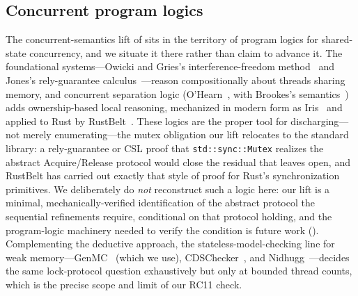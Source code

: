 \documentclass[journal,compsoc,10pt]{IEEEtran}
\providecommand{\citep}{\cite}
\theoremstyle{definition}
\theoremstyle{remark}
\begin{document}
\subsection{Concurrent program logics}
\label{sec:related-cpl}
The concurrent-semantics lift of  sits
in the territory of program logics for shared-state concurrency, and we
situate it there rather than claim to advance it. The
foundational systems---Owicki and Gries's interference-freedom
method~\citep{OwickiGries1976} and Jones's rely-guarantee
calculus~\citep{Jones1983RelyGuarantee}---reason compositionally about
threads sharing memory, and concurrent separation logic
(O'Hearn~\citep{OHearn2007CSL}, with Brookes's
semantics~\citep{Brookes2007CSL}) adds ownership-based local reasoning,
mechanized in modern form as Iris~\citep{JungEtAl2018Iris} and applied
to Rust by RustBelt~\citep{Jung2017RustBelt}. These logics are the
proper tool for discharging---not merely enumerating---the mutex
obligation our lift relocates to the standard library: a
rely-guarantee or CSL proof that \texttt{std::sync::Mutex} realizes the
abstract Acquire/Release protocol would close the residual that
 leaves open, and RustBelt has carried
out exactly that style of proof for Rust's synchronization primitives.
We deliberately do \emph{not} reconstruct such a logic here: our lift is
a minimal, mechanically-verified identification of the abstract
protocol the sequential refinements require, conditional on that
protocol holding, and the program-logic machinery needed to verify the
condition is future work (). Complementing the
deductive approach, the stateless-model-checking line for weak
memory---GenMC~\citep{KokologiannakisVafeiadis2021GenMC} (which we use),
CDSChecker~\citep{NorrisDemsky2013CDSChecker}, and
Nidhugg~\citep{AbdullaEtAl2015Nidhugg}---decides the same lock-protocol
question exhaustively but only at bounded thread counts, which is the
precise scope and limit of our RC11 check.
\end{document}
